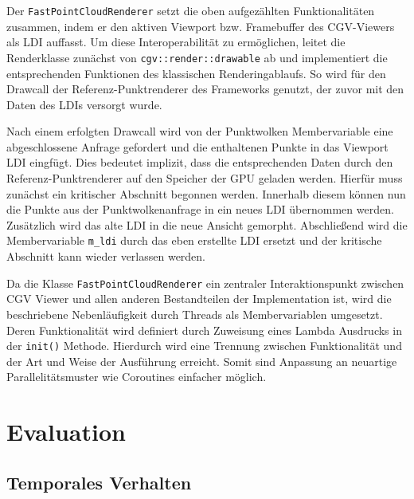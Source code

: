 \documentclass[hyperref, beleg, german, final, twoside]{cgvpub}
\begin{document}
Der \texttt{FastPointCloudRenderer} setzt die oben aufgezählten
Funktionalitäten zusammen, indem er den aktiven Viewport bzw. Framebuffer des
CGV-Viewers als LDI auffasst. Um diese Interoperabilität zu ermöglichen, leitet
die Renderklasse zunächst von \texttt{cgv::render::drawable} ab und
implementiert die entsprechenden Funktionen des klassischen Renderingablaufs.
So wird für den Drawcall der Referenz-Punktrenderer des Frameworks genutzt, der
zuvor mit den Daten des LDIs versorgt wurde.

Nach einem erfolgten Drawcall wird von der Punktwolken Membervariable eine
abgeschlossene Anfrage gefordert und die enthaltenen Punkte in das Viewport LDI
eingfügt. Dies bedeutet implizit, dass die entsprechenden Daten durch den
Referenz-Punktrenderer auf den Speicher der GPU geladen werden. Hierfür muss
zunächst ein kritischer Abschnitt begonnen werden. Innerhalb diesem können nun
die Punkte aus der Punktwolkenanfrage in ein neues LDI übernommen werden.
Zusätzlich wird das alte LDI in die neue Ansicht gemorpht. Abschließend wird die
Membervariable \texttt{m\_ldi} durch das eben erstellte LDI ersetzt und der
kritische Abschnitt kann wieder verlassen werden.

Da die Klasse \texttt{FastPointCloudRenderer} ein zentraler Interaktionspunkt
zwischen CGV Viewer und allen anderen Bestandteilen der Implementation ist, wird
die beschriebene Nebenläufigkeit durch Threads als Membervariablen umgesetzt.
Deren Funktionalität wird definiert durch Zuweisung eines Lambda Ausdrucks in
der \texttt{init()} Methode. Hierdurch wird eine Trennung zwischen
Funktionalität und der Art und Weise der Ausführung erreicht. Somit sind
Anpassung an neuartige Parallelitätsmuster wie Coroutines einfacher möglich.

\chapter{Evaluation}

\section{Temporales Verhalten}
\end{document}
